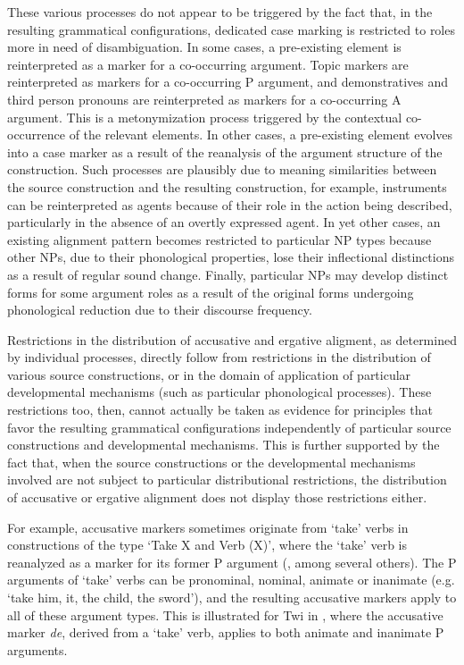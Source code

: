 \documentclass[output=paper]{langsci/langscibook}
\begin{document}
These various processes do not appear to be triggered by the fact
that, in the resulting grammatical configurations, dedicated case marking is
restricted to roles more in need of disambiguation. 
In some cases, a
pre-existing element  is reinterpreted as a
marker for a co-occurring argument. Topic markers
are reinterpreted as markers for a co-occurring P argument, and
demonstratives and third person pronouns are reinterpreted as markers
for a co-occurring A argument.  This is a metonymization process triggered by the
  contextual co-occurrence of the relevant elements. In other cases,
  a pre-existing element evolves into a case marker  as a
  result of the reanalysis of the argument structure of the
  construction. Such processes are plausibly due to meaning
  similarities between the source construction and the resulting
  construction, for example, instruments can be reinterpreted as
  agents  because of their role in the action being described,
  particularly in the absence of an overtly expressed
  agent. 
 In yet other cases, an existing alignment pattern becomes restricted to
particular NP types because other NPs, due to their phonological
properties, lose their inflectional distinctions as a result of
regular sound change. Finally, particular NPs may develop distinct forms
for some argument roles as a result of the original forms undergoing
phonological reduction due to their discourse frequency. 

Restrictions in the distribution of accusative and ergative aligment,
as determined by individual processes, directly follow from  restrictions in the distribution of
various source constructions, or in the domain of application of particular developmental mechanisms (such as particular phonological processes). These restrictions too, then, cannot actually
be taken as evidence  for principles that favor the resulting
grammatical configurations independently of particular source
constructions and developmental mechanisms. This is further
supported by the fact that, when the source constructions or the
developmental mechanisms involved are not subject to particular
distributional restrictions, the distribution of accusative or
ergative alignment does not display those restrictions either.

For example, accusative
markers sometimes originate from  `take' verbs in constructions of the type `Take
X and Verb (X)', where the `take' verb is reanalyzed as a marker
for its former
       P argument (\citealt{Lord1993,Chappell2013}, among
         several others). The P arguments of `take' verbs can be pronominal, nominal, animate or inanimate (e.g. `take him, it, the child, the sword'), 
and the resulting accusative markers apply to all of these
argument types. This is illustrated for Twi 
in 
 ,
where the accusative marker {\em de},
         derived from a `take' verb, applies to both animate and inanimate P arguments.
\end{document}

